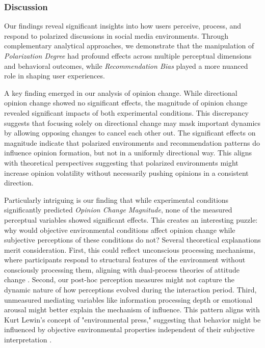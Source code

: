 \subsubsection{Discussion}

Our findings reveal significant insights into how users perceive, process, and respond to polarized discussions in social media environments. Through complementary analytical approaches, we demonstrate that the manipulation of \emph{Polarization Degree} had profound effects across multiple perceptual dimensions and behavioral outcomes, while \emph{Recommendation Bias} played a more nuanced role in shaping user experiences.

A key finding emerged in our analysis of opinion change. While directional opinion change showed no significant effects, the magnitude of opinion change revealed significant impacts of both experimental conditions. This discrepancy suggests that focusing solely on directional change may mask important dynamics by allowing opposing changes to cancel each other out. The significant effects on magnitude indicate that polarized environments and recommendation patterns do influence opinion formation, but not in a uniformly directional way. This aligns with theoretical perspectives suggesting that polarized environments might increase opinion volatility without necessarily pushing opinions in a consistent direction.

Particularly intriguing is our finding that while experimental conditions significantly predicted \emph{Opinion Change Magnitude}, none of the measured perceptual variables showed significant effects. This creates an interesting puzzle: why would objective environmental conditions affect opinion change while subjective perceptions of these conditions do not? Several theoretical explanations merit consideration. First, this could reflect unconscious processing mechanisms, where participants respond to structural features of the environment without consciously processing them, aligning with dual-process theories of attitude change \citep{petty_elaboration_1986, chaiken_the_2014}. Second, our post-hoc perception measures might not capture the dynamic nature of how perceptions evolved during the interaction period. Third, unmeasured mediating variables like information processing depth or emotional arousal might better explain the mechanism of influence. This pattern aligns with Kurt Lewin's concept of "environmental press," suggesting that behavior might be influenced by objective environmental properties independent of their subjective interpretation \citep{lewin_principles_2013}.


